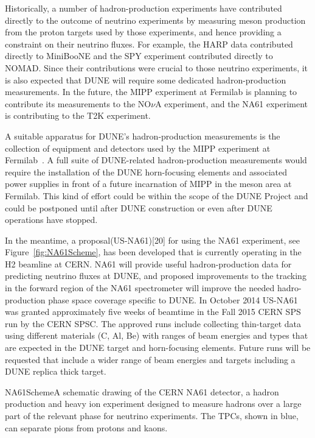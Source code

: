 Historically, a number of hadron-production experiments have
contributed directly to the outcome of neutrino experiments
by measuring meson production from the proton targets used
by those experiments, and hence providing a constraint on their neutrino fluxes. 
For example, the HARP data\cite{ref:HARP} contributed directly to
MiniBooNE and the SPY\cite{ref:SPY} experiment contributed directly to
NOMAD. Since their contributions were crucial to those neutrino experiments, 
it is also expected that DUNE will require some dedicated hadron-production measurements.
In the future, the MIPP experiment at Fermilab is planning to contribute its
measurements to the NO$\nu$A experiment, and the NA61
experiment\cite{Abgrall:2011ae} is contributing to the T2K
experiment.

A suitable apparatus for DUNE's hadron-production measurements
is the collection of equipment and detectors used by the MIPP experiment at Fermilab~\cite{Isenhower:2006zp}.   
A full suite of DUNE-related
hadron-production measurements would require the installation of the DUNE horn-focusing
elements and associated power supplies in front of a future
incarnation of MIPP in the meson area at Fermilab.
This kind of effort could be within the scope of the DUNE Project and could be postponed
until after DUNE construction or even after DUNE operations have
stopped. 

In the meantime, a proposal(US-NA61)[20] for using the NA61 experiment, see Figure~\ref{fig:NA61Scheme}, has been developed
that is currently operating in the H2 beamline at CERN. NA61 will provide useful 
hadron-production data for predicting neutrino fluxes at DUNE, and proposed improvements 
to the tracking in the forward region of the NA61 spectrometer will improve the needed 
hadro-production phase space coverage specific to DUNE. In October 2014 US-NA61 was granted approximately
five weeks of beamtime in the Fall 2015 CERN SPS run by the CERN SPSC. The approved
runs include collecting thin-target data using different materials (C, Al, Be) with 
ranges of beam energies and types  that are expected in the DUNE target and horn-focusing elements. 
Future runs will be requested that include a wider range of beam energies and targets including a DUNE
replica thick target. 


\begin{cdrfigure}{NA61Scheme}{A schematic drawing of the CERN NA61 detector, a hadron production and heavy ion experiment 
designed to measure hadrons over a large part of the relevant phase for 
neutrino experiments. The TPCs, shown in blue, can separate pions from protons and kaons.}
\end{cdrfigure}
